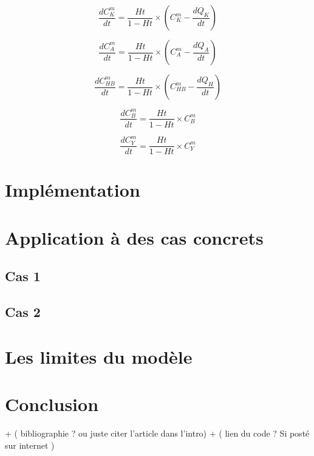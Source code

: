 \documentclass[a4paper,fleqn]{article}
\begin{document}
\begin{equation}
\frac{dC_{K}^m}{dt}={\frac{Ht}{1 - Ht}}\times{\left(C_{K}^m-\frac{dQ_{K}}{dt}\right)}
\end{equation}

\begin{equation}
\frac{dC_{A}^m}{dt}={\frac{Ht}{1 - Ht}}\times{\left(C_{A}^m-\frac{dQ_{A}}{dt}\right)}
\end{equation}

\begin{equation}
\frac{dC_{HB}^m}{dt}={\frac{Ht}{1 - Ht}}\times{\left(C_{HB}^m-\frac{dQ_{H}}{dt}\right)}
\end{equation}

\begin{equation}
\frac{dC_{B}^m}{dt}={\frac{Ht}{1 - Ht}}\times{C_{B}^m}
\end{equation}

\begin{equation}
\frac{dC_{Y}^m}{dt}={\frac{Ht}{1 - Ht}}\times{C_{Y}^m}
\end{equation}


\section{Implémentation}   






\section{Application à des cas concrets}     

\subsection{Cas 1} 

\subsection{Cas 2} 

\section{Les limites du modèle}


\section{Conclusion} 

+ ( bibliographie ? ou juste citer l'article dans l'intro)
+ ( lien du code ? Si posté sur internet )
 
\end{document}
